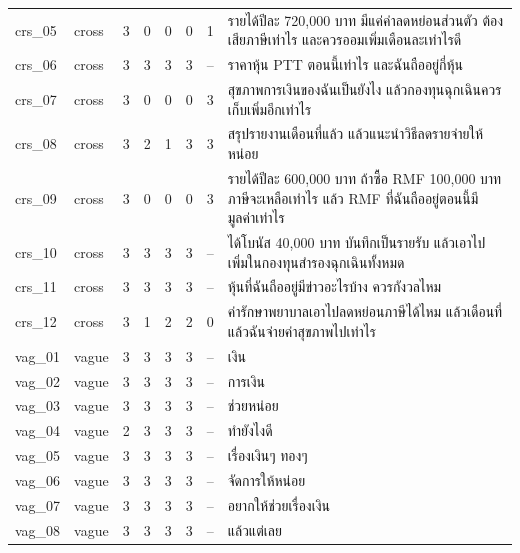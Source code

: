 \documentclass[11pt,a4paper]{article}
\begin{document}
{\begin{longtable}{llrrrrrp{7.2cm}}
crs\_\allowbreak{}05 & cross & 3 & 0 & 0 & 0 & 1 & {\thaifont รายได้ปีละ }720,000 {\thaifont บาท มีแค่ค่าลดหย่อนส่วนตัว ต้องเสียภาษีเท่าไร และควรออมเพิ่มเดือนละเท่าไรดี} \\
crs\_\allowbreak{}06 & cross & 3 & 3 & 3 & 3 & -- & {\thaifont ราคาหุ้น }PTT {\thaifont ตอนนี้เท่าไร และฉันถืออยู่กี่หุ้น} \\
crs\_\allowbreak{}07 & cross & 3 & 0 & 0 & 0 & 3 & {\thaifont สุขภาพการเงินของฉันเป็นยังไง แล้วกองทุนฉุกเฉินควรเก็บเพิ่มอีกเท่าไร} \\
crs\_\allowbreak{}08 & cross & 3 & 2 & 1 & 3 & 3 & {\thaifont สรุปรายงานเดือนที่แล้ว แล้วแนะนำวิธีลดรายจ่ายให้หน่อย} \\
crs\_\allowbreak{}09 & cross & 3 & 0 & 0 & 0 & 3 & {\thaifont รายได้ปีละ }600,000 {\thaifont บาท ถ้าซื้อ }RMF 100,000 {\thaifont บาท ภาษีจะเหลือเท่าไร แล้ว }RMF {\thaifont ที่ฉันถืออยู่ตอนนี้มีมูลค่าเท่าไร} \\
crs\_\allowbreak{}10 & cross & 3 & 3 & 3 & 3 & -- & {\thaifont ได้โบนัส }40,000 {\thaifont บาท บันทึกเป็นรายรับ แล้วเอาไปเพิ่มในกองทุนสำรองฉุกเฉินทั้งหมด} \\
crs\_\allowbreak{}11 & cross & 3 & 3 & 3 & 3 & -- & {\thaifont หุ้นที่ฉันถืออยู่มีข่าวอะไรบ้าง ควรกังวลไหม} \\
crs\_\allowbreak{}12 & cross & 3 & 1 & 2 & 2 & 0 & {\thaifont ค่ารักษาพยาบาลเอาไปลดหย่อนภาษีได้ไหม แล้วเดือนที่แล้วฉันจ่ายค่าสุขภาพไปเท่าไร} \\
vag\_\allowbreak{}01 & vague & 3 & 3 & 3 & 3 & -- & {\thaifont เงิน} \\
vag\_\allowbreak{}02 & vague & 3 & 3 & 3 & 3 & -- & {\thaifont การเงิน} \\
vag\_\allowbreak{}03 & vague & 3 & 3 & 3 & 3 & -- & {\thaifont ช่วยหน่อย} \\
vag\_\allowbreak{}04 & vague & 2 & 3 & 3 & 3 & -- & {\thaifont ทำยังไงดี} \\
vag\_\allowbreak{}05 & vague & 3 & 3 & 3 & 3 & -- & {\thaifont เรื่องเงินๆ ทองๆ} \\
vag\_\allowbreak{}06 & vague & 3 & 3 & 3 & 3 & -- & {\thaifont จัดการให้หน่อย} \\
vag\_\allowbreak{}07 & vague & 3 & 3 & 3 & 3 & -- & {\thaifont อยากให้ช่วยเรื่องเงิน} \\
vag\_\allowbreak{}08 & vague & 3 & 3 & 3 & 3 & -- & {\thaifont แล้วแต่เลย} \\
\end{longtable}}
\end{document}
